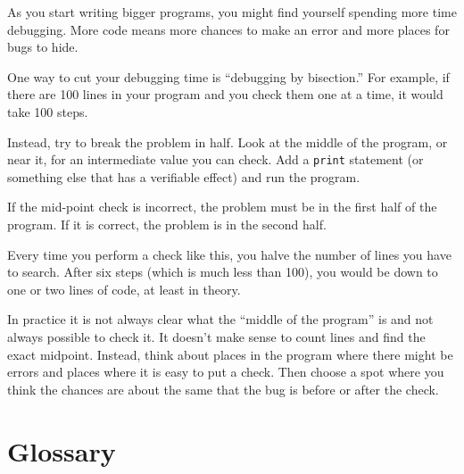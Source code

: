 As you start writing bigger programs, you might find yourself
spending more time debugging.  More code means more chances to
make an error and more places for bugs to hide.


One way to cut your debugging time is ``debugging by bisection.''
For example, if there are 100 lines in your program and you
check them one at a time, it would take 100 steps.

Instead, try to break the problem in half.  Look at the middle
of the program, or near it, for an intermediate value you
can check.  Add a {\tt print} statement (or something else
that has a verifiable effect) and run the program.

If the mid-point check is incorrect, the problem must be in the
first half of the program.  If it is correct, the problem is
in the second half.

Every time you perform a check like this, you halve the number
of lines you have to search.  After six steps (which is much
less than 100), you would be down to one or two lines of code,
at least in theory.

In practice it is not always clear what
the ``middle of the program'' is and not always possible to
check it.  It doesn't make sense to count lines and find the
exact midpoint.  Instead, think about places
in the program where there might be errors and places where it
is easy to put a check.  Then choose a spot where you
think the chances are about the same that the bug is before
or after the check.

\section{Glossary}

